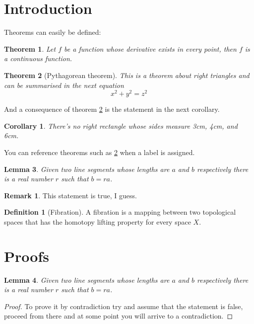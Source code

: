 \documentclass{article}
\begin{document}
\newtheorem{theorem}{Theorem}[section]
\newtheorem{corollary}{Corollary}[theorem]
\newtheorem{lemma}[theorem]{Lemma}

\theoremstyle{definition}
\newtheorem{definition}{Definition}[section]
\newtheorem*{remark}{Remark}

\section{Introduction}
Theorems can easily be defined:

\begin{theorem}
  Let \(f\) be a function whose derivative exists in every point, then \(f\) 
  is a continuous function.
\end{theorem}


\begin{theorem}[Pythagorean theorem]
  \label{pythagorean}
  This is a theorem about right triangles and can be summarised in the next 
  equation 
  \[ x^2 + y^2 = z^2 \]
\end{theorem}

And a consequence of theorem \ref{pythagorean} is the statement in the next 
corollary.

\begin{corollary}
  There's no right rectangle whose sides measure 3cm, 4cm, and 6cm.
\end{corollary}

You can reference theorems such as \ref{pythagorean} when a label is assigned.

\begin{lemma}
  Given two line segments whose lengths are \(a\) and \(b\) respectively there is a 
  real number \(r\) such that \(b=ra\).
\end{lemma}

\begin{remark}
  This statement is true, I guess.
\end{remark}

\begin{definition}[Fibration]
  A fibration is a mapping between two topological spaces that has the homotopy lifting property for every space \(X\).
\end{definition}

\renewcommand\qedsymbol{$\blacksquare$}
\section{Proofs}
\begin{lemma}
  Given two line segments whose lengths are \(a\) and \(b\) respectively there 
  is a real number \(r\) such that \(b=ra\).
\end{lemma}

\begin{proof}
  To prove it by contradiction try and assume that the statement is false,
  proceed from there and at some point you will arrive to a contradiction.
\end{proof}
\end{document}
